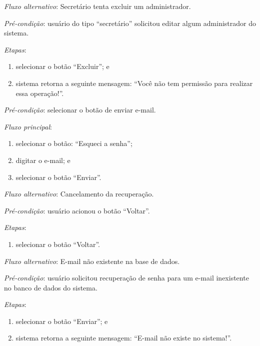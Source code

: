 \noindent \textit{Fluxo alternativo}: Secretário tenta excluir um administrador.

\noindent \textit{Pré-condição}: usuário do tipo ``secretário'' solicitou editar algum administrador do sistema.

\noindent \textit{Etapas}:

\begin{enumerate}
    \item selecionar o botão ``Excluir''; e
    \item sistema retorna a seguinte mensagem: ``Você não tem permissão para realizar essa operação!''.
\end{enumerate}



\vspace{0.7cm}

\noindent \textit{Pré-condição}: selecionar o botão de enviar e-mail.

\noindent \textit{Fluxo principal}:

\begin{enumerate}
    \item selecionar o botão: ``Esqueci a senha'';
    \item digitar o e-mail; e
    \item selecionar o botão ``Enviar''.
\end{enumerate}

\noindent \textit{Fluxo alternativo}: Cancelamento da recuperação.

\noindent \textit{Pré-condição}: usuário acionou o botão ``Voltar''.

\noindent \textit{Etapas}:

\begin{enumerate}
    \item selecionar o botão ``Voltar''.
\end{enumerate}


\noindent \textit{Fluxo alternativo}: E-mail não existente na base de dados.

\noindent \textit{Pré-condição}: usuário solicitou recuperação de senha para um e-mail inexistente no banco de dados do sistema.

\noindent \textit{Etapas}:

\begin{enumerate}
    \item selecionar o botão ``Enviar''; e
    \item sistema retorna a seguinte mensagem: ``E-mail não existe no sistema!''.
\end{enumerate}


